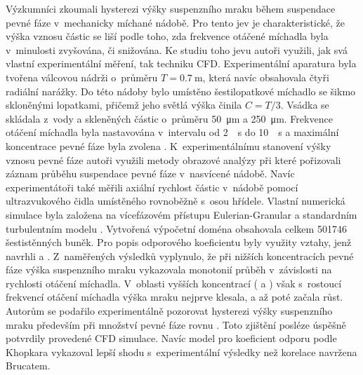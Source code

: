 Výzkumníci \citet{sar10} zkoumali hysterezi výšky suspenzního mraku během suspendace pevné fáze v~mechanicky míchané nádobě. 
Pro tento jev je charakteristické, že výška vznosu částic se liší podle toho, zda frekvence otáčené míchadla byla v~minulosti zvyšována, či snižována. Ke studiu toho jevu autoři využili, jak svá vlastní experimentální měření, tak techniku CFD. Experimentální aparatura byla tvořena válcovou nádrži o~průměru $T=\SI{0.7}{\meter}$, která navíc obsahovala čtyři radiální narážky. Do této nádoby bylo umístěno šestilopatkové míchadlo se šikmo skloněnými lopatkami, přičemž jeho světlá výška činila $C=T/3$. Vsádka se skládala z~vody a skleněných částic o~průměru \SI{50}{\micro\meter} a \SI{250}{\micro\meter}. Frekvence otáčení míchadla byla nastavována v~intervalu od \SI{2}{\per\second} do \SI{10}{\per\second} a maximální koncentrace pevné fáze byla zvolena . K~experimentálnímu stanovení výšky vznosu pevné fáze autoři využili metody obrazové analýzy při které pořizovali záznam průběhu suspendace pevné fáze v~nasvícené nádobě. Navíc experimentátoři také měřili axiální rychlost částic v~nádobě pomocí ultrazvukového čidla umístěného rovnoběžně s~osou hřídele. Vlastní numerická simulace byla založena na vícefázovém přístupu Eulerian-Granular a standardním turbulentním modelu \keps{}. Vytvořená výpočetní doména obsahovala celkem \num{501746} šestistěnných buněk. Pro popis odporového koeficientu byly využity vztahy, jenž navrhli \citet{bru98} a \citet{kho06}. Z~naměřených výsledků vyplynulo, že při nižších koncentracích pevné fáze výška suspenzního mraku vykazovala monotonií průběh v~závislosti na rychlosti otáčení míchadla. V~oblasti vyšších koncentrací ( a ) však s~rostoucí frekvencí otáčení míchadla výška mraku nejprve klesala, a až poté začala růst. Autorům se podařilo experimentálně pozorovat hysterezi výšky suspenzního mraku především při množství pevné fáze rovnu . Toto zjištění posléze úspěšně potvrdily provedené CFD simulace. Navíc model pro koeficient odporu podle Khopkara vykazoval lepší shodu s~experimentální výsledky než korelace navržena Brucatem.


